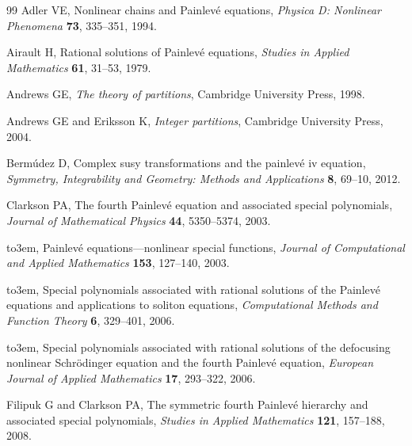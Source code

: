 \documentclass{amsart}
\theoremstyle{definition}
\begin{document}
\providecommand{\bysame}{\leavevmode\hbox to3em{\hrulefill}\thinspace}
\providecommand{\MR}{\relax\ifhmode\unskip\space\fi MR }
\providecommand{\MRhref}[2]{%
  \href{http://www.ams.org/mathscinet-getitem?mr=#1}{#2}
}
\providecommand{\href}[2]{#2}
\begin{thebibliography}{99}
 Adler VE, {{Nonlinear chains and
      Painlev{\'e} equations}}, \textit{Physica D: Nonlinear
    Phenomena} \textbf{73}, 335--351, 1994.

Airault H, {{Rational solutions of
Painlev{\'e} equations}}, \textit{Studies in Applied Mathematics} \textbf{61},
31--53, 1979.

Andrews GE, \textit{The theory of partitions},
Cambridge University Press, 1998.

Andrews GE and Eriksson K, \textit{Integer
partitions}, Cambridge University Press, 2004.

Berm{\'u}dez D, {Complex susy
transformations and the painlev{\'e} iv equation}, \textit{Symmetry,
Integrability and Geometry: Methods and Applications} \textbf{8},
69--10, 2012.

 Clarkson PA, {{The fourth Painlev{\'e}
equation and associated special polynomials}}, \textit{Journal of Mathematical
Physics} \textbf{44}, 5350--5374,  2003.

 \bysame, {Painlev{\'e}
equations---nonlinear special functions}, \textit{Journal of
Computational and Applied Mathematics} \textbf{153}, 127--140, 2003.

 \bysame, {Special
polynomials associated with rational solutions of the Painlev{\'e}
equations and applications to soliton equations}, \textit{Computational
Methods and Function Theory} \textbf{6}, 329--401,  2006.

 \bysame, {{Special polynomials
associated with rational solutions of the defocusing nonlinear
Schr{\"o}dinger equation and the fourth Painlev{\'e} equation}},
\textit{European Journal of Applied Mathematics} \textbf{17},
293--322, 2006.

Filipuk G and Clarkson PA, {{The
      symmetric fourth Painlev{\'e} hierarchy and associated special
      polynomials}}, \textit{Studies in Applied Mathematics}
  \textbf{121}, 157--188, 2008.


\end{thebibliography}
\end{document}
